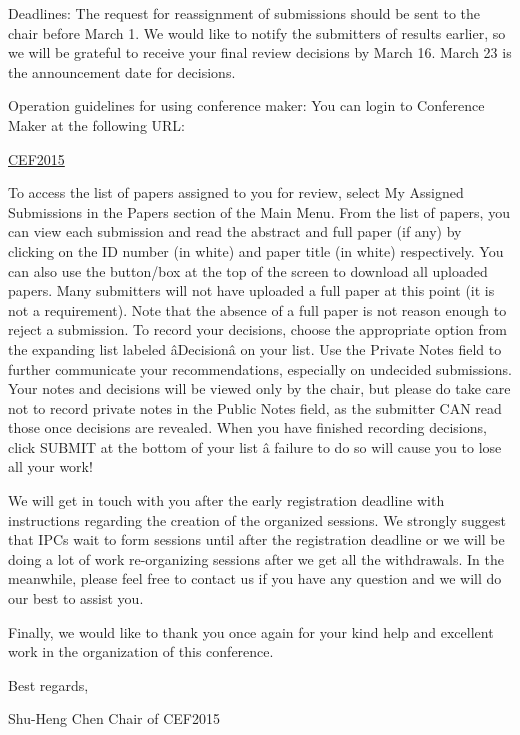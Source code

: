 \documentclass[12pt]{article}
\begin{document}
Deadlines: 
The request for reassignment of submissions should be sent to the chair before March 1.
We would like to notify the submitters of results earlier, so we will be grateful to receive your final review decisions by March 16. 
March 23 is the announcement date for decisions.



Operation guidelines for using conference maker: You can login to Conference Maker at the following URL:

\href{https://editorialexpress.com/cgi-bin/conference/conference.cgi?action=login&subaction=login&db_name=CEF2015}{CEF2015}

To access the list of papers assigned to you for review, select My Assigned Submissions in the Papers section of the Main Menu. 
From the list of papers, you can view each submission and read the abstract and full paper (if any) by clicking on the ID number (in white) and paper title (in white) respectively. You can also use the button/box at the top of the screen to download all uploaded papers. 
Many submitters will not have uploaded a full paper at this point (it is not a requirement). Note that the absence of a full paper is not reason enough to reject a submission. 
To record your decisions, choose the appropriate option from the expanding list labeled âDecisionâ on your list. Use the Private Notes field to further communicate your recommendations, especially on undecided submissions. 
Your notes and decisions will be viewed only by the chair, but please do take care not to record private notes in the Public Notes field, as the submitter CAN read those once decisions are revealed. 
When you have finished recording decisions, click SUBMIT at the bottom of your list â failure to do so will cause you to lose all your work!

We will get in touch with you after the early registration deadline with instructions regarding the creation of the organized sessions.  We strongly suggest that IPCs wait to form sessions until after the registration deadline or we will be doing a lot of work re-organizing sessions after we get all the withdrawals. In the meanwhile, please feel free to contact us if you have any question and we will do our best to assist you. 

Finally, we would like to thank you once again for your kind help and excellent work in the organization of this conference. 

Best regards,

Shu-Heng Chen
Chair of CEF2015
\end{document}
